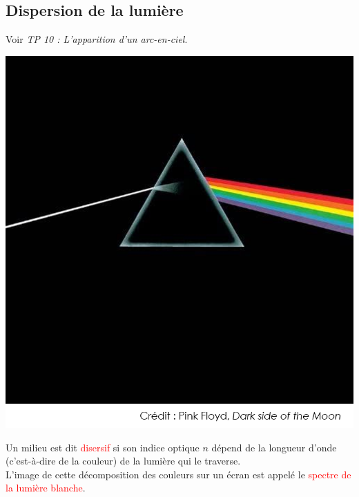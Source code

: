 \subsection{Dispersion de la lumière}
\begin{Large}
\end{Large}
Voir \textit{TP 10 : L'apparition d'un arc-en-ciel}.
\begin{multicols}{2}
    \begin{center}
        \includegraphics[scale=0.5]{Images/Pink_floyd.png}
    \end{center}
    
    \begin{tcolorbox}[colback=green!5!white,colframe=green!75!black,title=\textbf{Milieu dispersif et spectre:}, upperbox=invisible]
Un milieu est dit \textcolor{red}{disersif} si son indice optique $n$ dépend de la longueur d'onde (c'est-à-dire de la couleur) de la lumière qui le traverse.\\

L'image de cette décomposition des couleurs sur un écran est appelé le \textcolor{red}{spectre de la lumière blanche}.
\end{tcolorbox}
\end{multicols}

